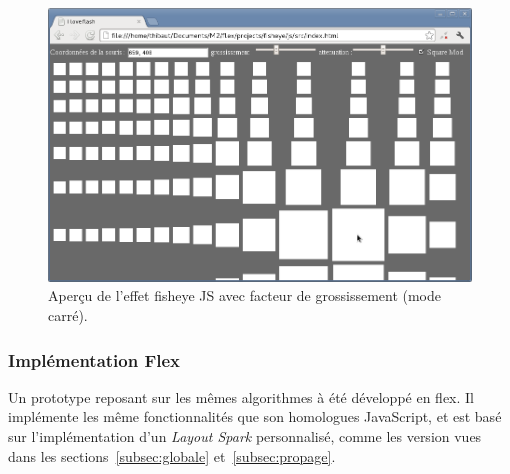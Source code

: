 \begin{minipage}[H]{.5\textwidth}
\begin{figure}[H]
  \centering
  \includegraphics[width=\textwidth]{../resources/illustrations/js_screen_3}
  \caption{Aperçu de l'effet fisheye JS avec facteur de grossissement (mode carré).}
  \label{fig:js_6}
\end{figure}
\end{minipage}

\subsubsection{Implémentation Flex}

Un prototype reposant sur les mêmes algorithmes à été développé en flex. Il implémente les même fonctionnalités que son homologues JavaScript, et est basé sur l'implémentation d'un \emph{Layout Spark} personnalisé, comme les version vues dans les sections~\ref{subsec:globale} et~\ref{subsec:propage}.

